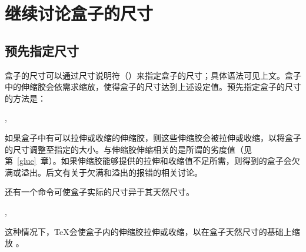 \documentclass{book}
\begin{document}
\section{继续讨论盒子的尺寸}

\subsection{预先指定尺寸}

盒子的尺寸可以通过尺寸说明符（）来指定盒子的尺寸；具体语法可见上文。盒子中的伸缩胶会依需求缩放，使得盒子的尺寸达到上述设定值。预先指定盒子的尺寸的方法是：
\begin{disp}
   ,
   
\end{disp}
如果盒子中有可以拉伸或收缩的伸缩胶，则这些伸缩胶会被拉伸或收缩，以将盒子的尺寸调整至指定的大小。与伸缩胶伸缩相关的是所谓的劣度值（见第~\ref{glue}~章）。如果伸缩胶能够提供的拉伸和收缩值不足所需，则得到的盒子会欠满或溢出。后文有关于欠满和溢出的报错的相关讨论。

还有一个命令可使盒子实际的尺寸异于其天然尺寸。
\begin{disp}
   ,
   
\end{disp}
这种情况下，\TeX 会使盒子内的伸缩胶拉伸或收缩，以在盒子天然尺寸的基础上缩放 。
\end{document}

